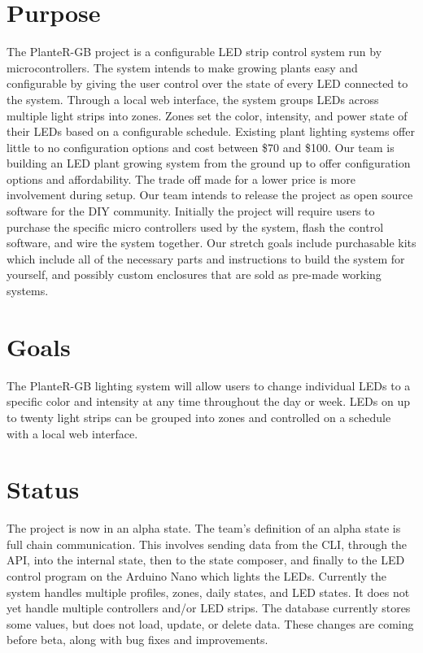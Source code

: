 \documentclass[onecolumn, draftclsnofoot,10pt, compsoc]{IEEEtran}
\begin{document}
	\section{Purpose}
	The PlanteR-GB project is a configurable LED strip control system run by microcontrollers.
	The system intends to make growing plants easy and configurable by giving the user control over the state of every LED connected to the system.
	Through a local web interface, the system groups LEDs across multiple light strips into zones.
	Zones set the color, intensity, and power state of their LEDs based on a configurable schedule.
	Existing plant lighting systems offer little to no configuration options and cost between \$70 and \$100. \cite{expensive1} \cite{expensive2} \cite{expensive3}
	Our team is building an LED plant growing system from the ground up to offer configuration options and affordability.
	The trade off made for a lower price is more involvement during setup. Our team intends to release the project as open source software for the DIY community.
	Initially the project will require users to purchase the specific micro controllers used by the system, flash the control software, and wire the system together.
	Our stretch goals include purchasable kits which include all of the necessary parts and instructions to build the system for yourself, and possibly custom enclosures that are sold as pre-made working systems.

	\section{Goals}
	The PlanteR-GB lighting system will allow users to change individual LEDs to a specific color and intensity at any time throughout the day or week.
	LEDs on up to twenty light strips can be grouped into zones and controlled on a schedule with a local web interface.

	\section{Status}
	The project is now in an alpha state. The team's definition of an alpha state is full chain communication.
	This involves sending data from the CLI, through the API, into the internal state, then to the state composer, and finally to the LED control program on the Arduino Nano which lights the LEDs.
	Currently the system handles multiple profiles, zones, daily states, and LED states.
	It does not yet handle multiple controllers and/or LED strips.
	The database currently stores some values, but does not load, update, or delete data.
	These changes are coming before beta, along with bug fixes and improvements.
\end{document}
